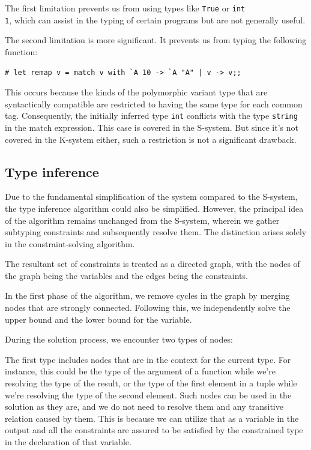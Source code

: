 \documentclass[a4paper,11pt,oneside]{article}
\theoremstyle{definition}
\begin{document}
The first limitation prevents us from using types like \texttt{True} or \texttt{int \\ 1}, which can assist in the typing of certain programs but are not generally useful.

The second limitation is more significant. It prevents us from typing the following function:

{\ttfamily\begin{verbatim}
# let remap v = match v with `A 10 -> `A "A" | v -> v;;
\end{verbatim}}

This occurs because the kinds of the polymorphic variant type that are syntactically compatible are restricted to having the same type for each common tag. Consequently, the initially inferred type \texttt{int} conflicts with the type \texttt{string} in the match expression. This case is covered in the S-system. But since it's not covered in the K-system either, such a restriction is not a significant drawback.

\subsection{Type inference}

Due to the fundamental simplification of the system compared to the S-system, the type inference algorithm could also be simplified.
However, the principal idea of the algorithm remains unchanged from the S-system, wherein we gather subtyping constraints and subsequently resolve them. The distinction arises solely in the constraint-solving algorithm.

The resultant set of constraints is treated as a directed graph, with the nodes of the graph being the variables and the edges being the constraints.

In the first phase of the algorithm, we remove cycles in the graph by merging nodes that are strongly connected. Following this, we independently solve the upper bound and the lower bound for the variable.

During the solution process, we encounter two types of nodes:

The first type includes nodes that are in the context for the current type. For instance, this could be the type of the argument of a function while we're resolving the type of the result, or the type of the first element in a tuple while we're resolving the type of the second element. Such nodes can be used in the solution as they are, and we do not need to resolve them and any transitive relation caused by them. This is because we can utilize that as a variable in the output and all the constraints are assured to be satisfied by the constrained type in the declaration of that variable.
\end{document}
